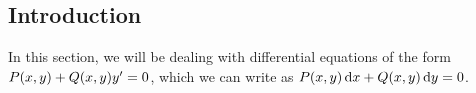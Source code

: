 \subsection{Introduction}
In this section, we will be dealing with differential equations of the form $P\p{x, y} + Q\p{x, y}y' = 0$, which we can write as $P\p{x, y}\,\diff{x} + Q\p{x, y}\,\diff{y} = 0$.